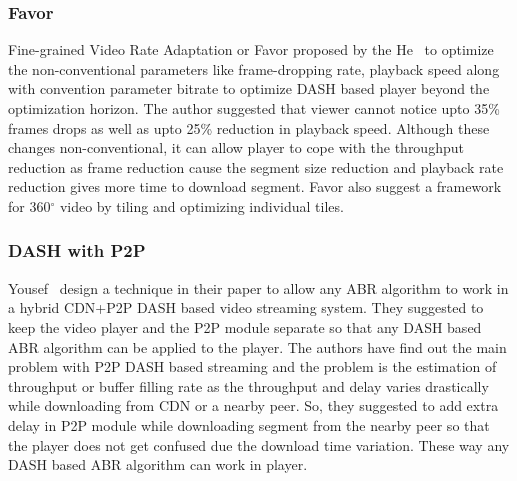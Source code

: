 \subsubsection{Favor}
Fine-grained Video Rate Adaptation or Favor\cite{10.1145/3204949.3204957} proposed by the He \etal\ to optimize the non-conventional parameters like frame-dropping rate, playback speed along with convention parameter bitrate to optimize DASH based player beyond the optimization horizon. The author suggested that viewer cannot notice upto 35\% frames drops as well as upto 25\% reduction in playback speed. Although these changes non-conventional, it can allow player to cope with the throughput reduction as frame reduction cause the segment size reduction and playback rate reduction gives more time to download segment. Favor also suggest a framework for 360$^{\circ}$ video by tiling and optimizing individual tiles.

\subsubsection{DASH with P2P}
Yousef \etal\ design a technique in their paper \cite{10.1145/3339825.3391859} to allow any ABR algorithm to work in a hybrid CDN+P2P DASH based video streaming system. They suggested to keep the video player and the P2P module separate so that any DASH based ABR algorithm can be applied to the player. The authors have find out the main problem with P2P DASH based streaming and the problem is the estimation of throughput or buffer filling rate as the throughput and delay varies drastically while downloading from CDN or a nearby peer. So, they suggested to add extra delay in P2P module while downloading segment from the nearby peer so that the player does not get confused due the download time variation. These way any DASH based ABR algorithm can work in player.

